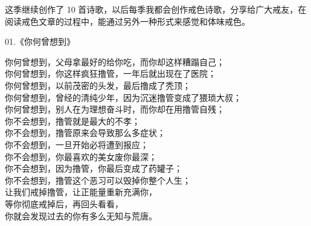 \documentclass{ctexart}
\begin{document}
这季继续创作了 10 首诗歌，以后每季我都会创作戒色诗歌，分享给广大戒友，在阅读戒色文章的过程中，能通过另外一种形式来感觉和体味戒色。

\begin{center}
    01.《你何曾想到》\it

    你何曾想到，父母拿最好的给你吃，而你却这样糟蹋自己； \\ 你何曾想到，你这样疯狂撸管，一年后就出现在了医院； \\ 你何曾想到，以前茂密的头发，最后撸成了秃顶； \\ 你何曾想到，曾经的清纯少年，因为沉迷撸管变成了猥琐大叔； \\ 你何曾想到，别人在为理想奋斗时，而你却在用撸管自残； \\ 你不会想到，撸管就是最大的不孝； \\ 你不会想到，撸管原来会导致那么多症状； \\ 你不会想到，一旦开始必将遭到报应； \\ 你不会想到，你最喜欢的美女废你最深； \\ 你不会想到，因为撸管，你最后变成了药罐子； \\ 你不会想到，撸管这个恶习可以毁掉你整个人生； \\ 让我们戒掉撸管，让正能量重新充满你， \\ 等你彻底戒掉后，再回头看看， \\ 你就会发现过去的你有多么无知与荒唐。
\end{center}
\end{document}
